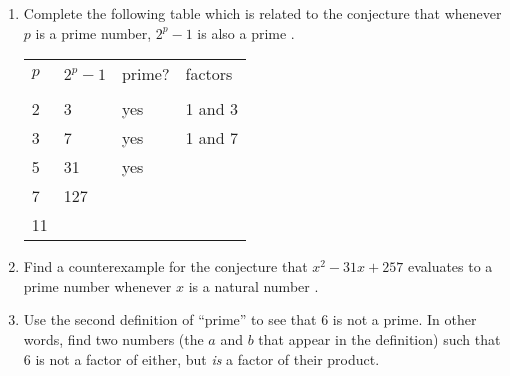\documentclass[10pt,]{book}
\theoremstyle{plain}
\theoremstyle{definition}
\theoremstyle{definition}
\numberwithin{equation}{section}
\newcommand{\hrulethin}  {\noalign{\hrule height 0.04em}}
\newcommand{\hint}[1]{ }
\begin{document}
\begin{enumerate}[label=(\alph*)]
        \hint{It might be helpful to write down a bunch of examples. Think about how the prime factorization of a number gets transformed when we square it.}
\item\hypertarget{li-29}{}
        Complete the following table which is related to 
        the conjecture that whenever \(p\) is a prime number, \(2^p-1\) is also a prime .
        \begin{tabular}{llll}
\(p\)&\(2^p-1\)&prime?&factors\tabularnewline[0pt]
&&&\tabularnewline\hrulethin
2&3&yes&1 and 3\tabularnewline[0pt]
3&7&yes&1 and 7\tabularnewline[0pt]
5&31&yes&\tabularnewline[0pt]
7&127&&\tabularnewline[0pt]
11&&&
\end{tabular}

        \hint{
        You'll need to determine if \(2^{11}-1 = 2047\) is prime or not. If you never figured out how to read the table of primes on page 15, here's a hint: If 2047 was a prime there would be a 7 in the cell at row 20, column 4.

        A quick way to find the factors of a not-too-large number is to use the "table" feature of your graphing calculator. If you enter y1=2047/X and select the table view (2ND GRAPH). Now, just scan down the entries until you find one with nothing after the decimal point. That's an X that evenly divides 2047!

        An even quicker way is to type \lstinline?factor(2047)? in Sage.
        }
\item\hypertarget{li-30}{}
        Find a counterexample for the conjecture that \(x^2-31x+257\) evaluates to a prime number
        whenever \(x\) is a natural number .



        \hint{Part of what makes the "prime-producing-power" of that polynomial impressive is that it gives each prime twice \textemdash{} once on the descending arm of the parabola and once on the ascending arm. In other words, the polynomial gives prime values on a set of contiguous natural numbers \(\{0,1,2, ..., N\}\) and the vertex of the parabola that is its graph lies dead in the middle of that range. You can figure out what \(N\) is by thinking about the other end of the range: \((-1)^2 + 31 \cdot (-1) + 257 = 289\) (\(289\) is not a prime, you should recognize it as a perfect square.)}
\item\hypertarget{li-31}{}
        Use the second definition of ``prime'' to see that \(6\) is
        not a prime.  In other words, find two numbers (the \(a\) and \(b\) 
        that appear in the definition) such that \(6\) is not a factor of
        either, but \emph{is} a factor of their product.




\end{enumerate}
\end{document}

